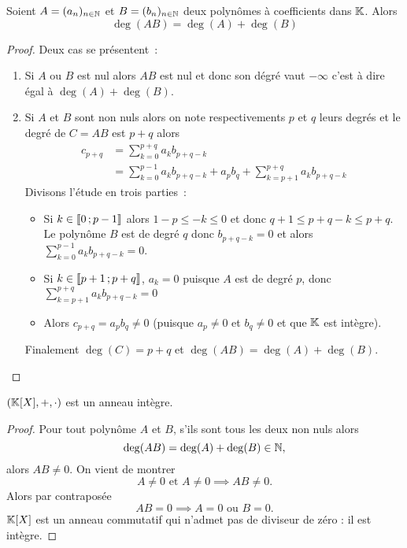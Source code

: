 \begin{prop}
  Soient $A=(a_n)_{n \in \mathbb{N}}$ et $B=(b_n)_{n \in \mathbb{N}}$ deux polynômes à coefficients dans $\mathbb{K}$. Alors
  \begin{equation}
    \deg(AB) = \deg(A)+\deg(B)
  \end{equation}
\end{prop}
\begin{proof}
  Deux cas se présentent~:
  \begin{enumerate}
  \item Si $A$ ou $B$ est nul alors $AB$ est nul et donc son dégré vaut $-\infty$ c'est à dire égal à $\deg(A)+\deg(B)$.
  \item Si $A$ et $B$ sont non nuls alors on note respectivements $p$ et $q$ leurs degrés et le degré de $C=AB$ est $p+q$ alors
    \begin{align}
      c_{p+q} &= \sum_{k=0}^{p+q} a_k b_{p+q-k} \\
      &= \sum_{k=0}^{p-1} a_k b_{p+q-k} + a_pb_q + \sum_{k=p+1}^{p+q} a_k b_{p+q-k}
    \end{align}
    Divisons l'étude en trois parties~:
    \begin{itemize}
    \item     Si $k \in \mathopen{\llbracket}0\mathclose{}\mathpunct{};p-1\mathclose{\rrbracket}$ alors $1-p \leqslant -k \leqslant 0$ et donc $q+1 \leqslant p+q-k \leqslant p+q$. Le polynôme $B$ est de degré $q$ donc $b_{p+q-k}=0$ et alors $\sum_{k=0}^{p-1} a_k b_{p+q-k}=0$. 
    \item Si $k \in \mathopen{\llbracket}p+1\mathclose{}\mathpunct{};p+q\mathclose{\rrbracket}$, $a_k =0$ puisque $A$ est de degré $p$, donc $\sum_{k=p+1}^{p+q} a_k b_{p+q-k}=0$
    \item Alors $c_{p+q}=a_pb_q \neq 0$ (puisque $a_p \neq 0$ et $b_q \neq 0$ et que $\mathbb{K}$ est intègre). 
      \end{itemize}
Finalement $\deg(C)=p+q$ et $\deg(AB)=\deg(A) + \deg(B)$.
  \end{enumerate}
\end{proof}

\begin{cor}
  $(\mathbb{K}[X],+,\cdot)$ est un anneau intègre.
\end{cor}
\begin{proof}
  Pour tout polynôme $A$ et $B$, s'ils sont tous les deux non nuls alors
  \begin{equation}
    \deg(AB) = \deg(A)+\deg(B) \in \mathbb{N},
  \end{equation}
  alors $AB \neq 0$. On vient de montrer
  \begin{equation}
    A\neq 0 \text{~et~} A \neq 0 \implies AB \neq 0.
  \end{equation}
  Alors par contraposée
  \begin{equation}
    AB = 0 \implies A=0 \text{~ou~} B=0.
  \end{equation}
  $\mathbb{K}[X]$ est un anneau commutatif qui n'admet pas de diviseur de zéro : il est intègre.
\end{proof}

